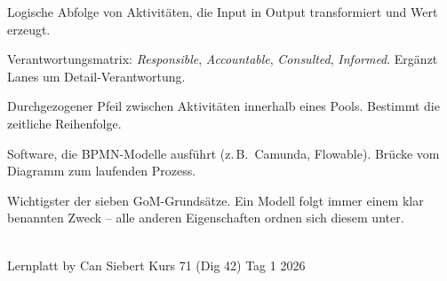 \documentclass[11pt,a4paper,oneside]{article}
\begin{document}
\begin{description}[style=nextline,leftmargin=0pt,labelindent=0pt,itemsep=4pt]
  \item[Prozess] Logische Abfolge von Aktivitäten, die Input in Output transformiert und Wert erzeugt.
  \item[RACI] Verantwortungsmatrix: \emph{Responsible}, \emph{Accountable}, \emph{Consulted}, \emph{Informed}. Ergänzt Lanes um Detail-Verantwortung.
  \item[Sequenzfluss] Durchgezogener Pfeil zwischen Aktivitäten innerhalb eines Pools. Bestimmt die zeitliche Reihenfolge.
  \item[Workflow-Engine] Software, die BPMN-Modelle ausführt (z.\,B.\ Camunda, Flowable). Brücke vom Diagramm zum laufenden Prozess.
  \item[Zweckorientierung] Wichtigster der sieben GoM-Grundsätze. Ein Modell folgt immer einem klar benannten Zweck -- alle anderen Eigenschaften ordnen sich diesem unter.
\end{description}

\vspace{1cm}
\noindent{\color{lpAccent}\rule{\linewidth}{0.6pt}}\\[4pt]
{\footnotesize\sffamily\color{lpGray}Lernplatt \textperiodcentered{} by Can Siebert \textperiodcentered{} Kurs 71 (Dig 42) \textperiodcentered{} Tag 1 \textperiodcentered{} \textcopyright{} 2026}
\end{document}
